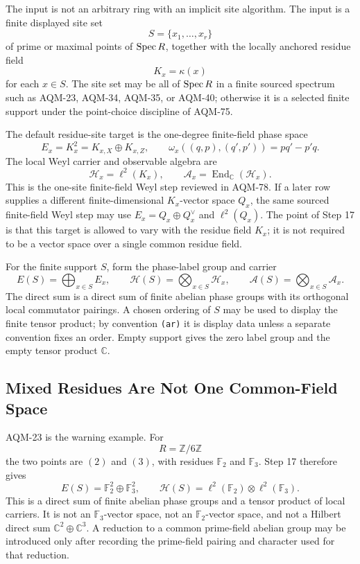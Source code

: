 The input is not an arbitrary ring with an implicit site algorithm.  The input
is a finite displayed site set
\[
  S=\{x_1,\ldots,x_r\}
\]
of prime or maximal points of \(\operatorname{Spec} R\), together with the locally anchored
residue field
\[
  K_x=\kappa(x)
\]
for each \(x\in S\).  The site set may be all of \(\operatorname{Spec} R\) in a finite
sourced spectrum such as AQM-23, AQM-34, AQM-35, or AQM-40; otherwise it is a
selected finite support under the point-choice discipline of AQM-75.

The default residue-site target is the one-degree finite-field phase space
\[
  E_x=K_x^2=K_{x,X}\oplus K_{x,Z},
  \qquad
  \omega_x((q,p),(q',p'))=pq'-p'q .
\]
The local Weyl carrier and observable algebra are
\[
  \mathcal H_x=\ell^2(K_x),
  \qquad
  \mathcal A_x=\operatorname{End}_{\mathbb C}(\mathcal H_x).
\]
This is the one-site finite-field Weyl step reviewed in AQM-78.  If a later
row supplies a different finite-dimensional \(K_x\)-vector space \(Q_x\), the
same sourced finite-field Weyl step may use \(E_x=Q_x\oplus Q_x^\vee\) and
\(\ell^2(Q_x)\).  The point of Step 17 is that this target is allowed to vary
with the residue field \(K_x\); it is not required to be a vector space over a
single common residue field.

For the finite support \(S\), form the phase-label group and carrier
\[
  E(S)=\bigoplus_{x\in S}E_x,
  \qquad
  \mathcal H(S)=\bigotimes_{x\in S}\mathcal H_x,
  \qquad
  \mathcal A(S)=\bigotimes_{x\in S}\mathcal A_x .
\]
The direct sum is a direct sum of finite abelian phase groups with its
orthogonal local commutator pairings.  A chosen ordering of \(S\) may be used
to display the finite tensor product; by convention \texttt{(ar)} it is
display data unless a separate convention fixes an order.  Empty support gives
the zero label group and the empty tensor product \(\mathbb C\).

\subsection{Mixed Residues Are Not One Common-Field Space}

AQM-23 is the warning example.  For
\[
  R=\mathbb Z/6\mathbb Z
\]
the two points are \((2)\) and \((3)\), with residues \(\mathbb F_2\) and
\(\mathbb F_3\).  Step 17 therefore gives
\[
  E(S)=\mathbb F_2^2\oplus\mathbb F_3^2,
  \qquad
  \mathcal H(S)=\ell^2(\mathbb F_2)\otimes\ell^2(\mathbb F_3).
\]
This is a direct sum of finite abelian phase groups and a tensor product of
local carriers.  It is not an \(\mathbb F_3\)-vector space, not an
\(\mathbb F_2\)-vector space, and not a Hilbert direct sum
\(\mathbb C^2\oplus\mathbb C^3\).  A reduction to a common prime-field
abelian group may be introduced only after recording the prime-field pairing
and character used for that reduction.

